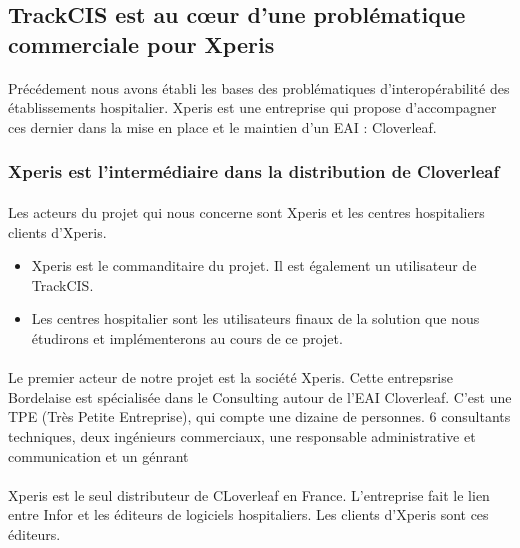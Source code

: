 	\subsection{TrackCIS est au cœur d'une problématique commerciale pour Xperis}
		\paragraph{}
		Précédement nous avons établi les bases des problématiques d'interopérabilité
		des établissements hospitalier. Xperis est une entreprise qui propose
		d'accompagner ces dernier dans la mise en place et le maintien d'un EAI :
		Cloverleaf.
		
		\subsubsection{Xperis est l'intermédiaire dans la distribution de Cloverleaf}
			\paragraph{}%
			Les acteurs du projet qui nous concerne sont Xperis et les centres
			hospitaliers clients d'Xperis.
			\begin{itemize}
			  \item Xperis est le commanditaire du projet. Il est également un
			  utilisateur de TrackCIS.
			  \item Les centres hospitalier sont les utilisateurs finaux de la solution
			  que nous étudirons et implémenterons au cours de ce projet.
			\end{itemize}
			
			\paragraph{}%
			Le premier acteur de notre projet est la société Xperis. Cette entrepsrise
			Bordelaise est spécialisée dans le Consulting autour de l'EAI Cloverleaf.
			C'est une TPE (Très Petite Entreprise), qui compte une dizaine de personnes.
			6 consultants techniques, deux ingénieurs commerciaux, une responsable
			administrative et communication et un génrant
			
			\paragraph{}%
			Xperis est le seul distributeur de CLoverleaf en France. L'entreprise fait le
			lien entre Infor et les éditeurs de logiciels hospitaliers. Les clients
			d'Xperis sont ces éditeurs.
			
